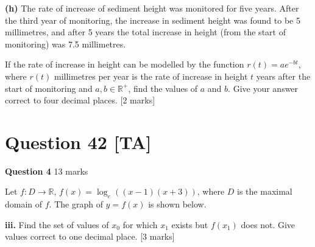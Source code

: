 \documentclass[10pt,a4paper]{article}
\begin{document}
\textbf{(h)} The rate of increase of sediment height was monitored for five years. After the third year of monitoring, the increase in sediment height was found to be 5 millimetres, and after 5 years the total increase in height (from the start of monitoring) was 7.5 millimetres.

If the rate of increase in height can be modelled by the function $r(t) = ae^{-bt}$, where $r(t)$ millimetres per year is the rate of increase in height $t$ years after the start of monitoring and $a, b \in \mathbb{R}^+$, find the values of $a$ and $b$. Give your answer correct to four decimal places. \hfill [2 marks]

\vspace{9\baselineskip}

\hrulefill

\section*{Question 42 [TA]}

\textbf{Question 4} \hfill 13 marks

Let $f : D \to \mathbb{R}$, $f(x) = \log_e((x-1)(x+3))$, where $D$ is the maximal domain of $f$. The graph of $y = f(x)$ is shown below.

\begin{center}
\end{center}

\textbf{iii.} Find the set of values of $x_0$ for which $x_1$ exists but $f(x_1)$ does not. Give values correct to one decimal place. \hfill [3 marks]

\vspace{9\baselineskip}

\hrulefill
\end{document}
